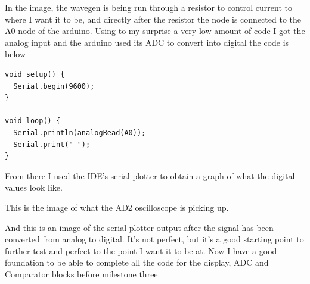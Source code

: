 \documentclass{article}
\begin{document}
In the image, the wavegen is being run through a resistor to control current to where I want it to be, and directly after the resistor the node is connected to the A0 node of the arduino. Using to my surprise a very low amount of code I got the analog input and the arduino used its ADC to convert into digital the code is below

\begin{lstlisting}[language=Arduino, caption=ADC Test Code]
void setup() {
  Serial.begin(9600);
}

void loop() {
  Serial.println(analogRead(A0));
  Serial.print(" ");
}
\end{lstlisting}
\newpage
From there I used the IDE’s serial plotter to obtain a graph of what  the digital values look like. 
\begin{center}
\end{center}
This is the image of what the AD2 oscilloscope is picking up.
\begin{center}
\end{center}
And this is an image of the serial plotter output after the signal has been converted from analog to digital. It's not perfect, but it's a good starting point to further test and perfect to the point I want it to be at. Now I have a good foundation to be able to complete all the code for the display, ADC and Comparator blocks before milestone three.
\newpage
\end{document}
